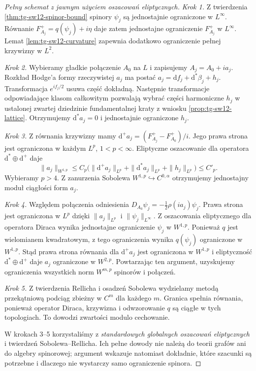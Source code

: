\begin{proof}[Pełny schemat z jawnym użyciem oszacowań eliptycznych]
\emph{Krok 1.} Z twierdzenia \ref{thm:tg-sw12-spinor-bound}
spinory $\psi_j$ są jednostajnie ograniczone w $L^\infty$.
Równanie $F_{A_j}^+=q(\psi_j)+i\eta$ daje zatem
jednostajne ograniczenie $F_{A_j}^+$ w $L^\infty$.
Lemat \ref{lem:tg-sw12-curvature} zapewnia dodatkowo
ograniczenie pełnej krzywizny w $L^2$.

\emph{Krok 2.} Wybieramy gładkie połączenie $A_0$ na $L$
i zapisujemy $A_j=A_0+i a_j$.
Rozkład Hodge'a formy rzeczywistej $a_j$ ma postać
$a_j=\mathrm df_j+\mathrm d^*\beta_j+h_j$.
Transformacja $e^{if_j/2}$ usuwa część dokładną.
Następnie transformacje odpowiadające klasom całkowitym
pozwalają wybrać części harmoniczne $h_j$ w ustalonej
zwartej dziedzinie fundamentalnej kraty z
wniosku \ref{prop:tg-sw12-lattice}. Otrzymujemy
$\mathrm d^*a_j=0$ i jednostajnie ograniczone $h_j$.

\emph{Krok 3.} Z równania krzywizny mamy
$\mathrm d^+a_j=(F_{A_j}^+-F_{A_0}^+)/i$.
Jego prawa strona jest ograniczona w każdym $L^p$,
$1<p<\infty$. Eliptyczne oszacowanie dla operatora
$\mathrm d^*\oplus\mathrm d^+$ daje
\[
\|a_j\|_{W^{1,p}}\le C_p
\bigl(\|\mathrm d^+a_j\|_{L^p}
+\|\mathrm d^*a_j\|_{L^p}+\|h_j\|_{L^p}\bigr)\le C'_p.
\]
Wybieramy $p>4$. Z zanurzenia Sobolewa
$W^{1,p}\hookrightarrow C^{0,\alpha}$ otrzymujemy
jednostajny moduł ciągłości form $a_j$.

\emph{Krok 4.} Względem połączenia odniesienia
$D_{A_0}\psi_j=-\tfrac12\rho(i a_j)\psi_j$.
Prawa strona jest ograniczona w $L^p$ dzięki
$\|a_j\|_{L^p}$ i $\|\psi_j\|_{L^\infty}$.
Z oszacowania eliptycznego dla operatora Diraca
wynika jednostajne ograniczenie $\psi_j$ w $W^{1,p}$.
Ponieważ $q$ jest wielomianem kwadratowym, z tego
ograniczenia wynika $q(\psi_j)$ ograniczone w $W^{1,p}$.
Stąd prawa strona równania dla $\mathrm d^+a_j$ jest
ograniczona w $W^{1,p}$ i eliptyczność
$\mathrm d^*\oplus\mathrm d^+$ daje $a_j$ ograniczone w
$W^{2,p}$. Powtarzając ten argument, uzyskujemy
ograniczenia wszystkich norm $W^{m,p}$ spinorów i połączeń.

\emph{Krok 5.} Z twierdzenia Rellicha i osadzeń Sobolewa
wydzielamy metodą przekątniową podciąg zbieżny w $C^m$
dla każdego $m$. Granica spełnia równania, ponieważ
operator Diraca, krzywizna i odwzorowanie $q$ są ciągłe
w tych topologiach. To dowodzi zwartości modulo cechowanie.

W krokach 3--5 korzystaliśmy z \emph{standardowych globalnych
oszacowań eliptycznych} i twierdzeń Sobolewa--Rellicha.
Ich pełne dowody nie należą do teorii grafów ani do
algebry spinorowej; argument wskazuje natomiast dokładnie,
które szacunki są potrzebne i dlaczego nie wystarczy samo
ograniczenie spinora.
\end{proof}

